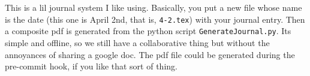 This is a lil journal system I like using.  
Basically, you put a new file whose name is the date (this one is April 2nd, that is, \texttt{4-2.tex}) with your journal entry.  
Then a composite pdf is generated from the python script \texttt{GenerateJournal.py}.  
Its simple and offline, so we still have a collaborative thing but without the annoyances of sharing a google doc.  
The pdf file could be generated during the pre-commit hook, if you like that sort of thing.    
